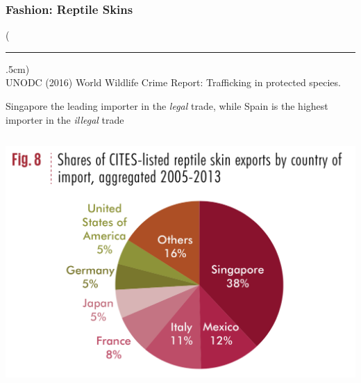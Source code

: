 \documentclass[10pt]{beamer}
\newenvironment{reference}[2]{%
	\begin{textblock*}{\textwidth}(#1,#2)
		\tiny\bgroup\color{gray}}{\egroup\end{textblock*}}
\begin{document}
\begin{frame}[t]
\frametitle{Fashion: Reptile Skins}
\vspace{0.25cm}

	\begin{reference}{4mm}{92mm}
		\rule{1.5cm}{0.25pt}\\
		UNODC (2016) World Wildlife Crime Report: Trafficking in protected species.
	\end{reference}
	
	Singapore the leading importer in the \emph{legal} trade, while Spain is the highest importer in the \emph{illegal} trade\\
	
	\vspace{0.25cm} 

	\begin{columns}
		\begin{column}{0.5\textwidth}
			\begin{center}
				\includegraphics[width=1.0\textwidth]{figures/fashion_legal_import.png}
			\end{center}
		\end{column}
		

\end{columns}
\end{frame}
\end{document}
